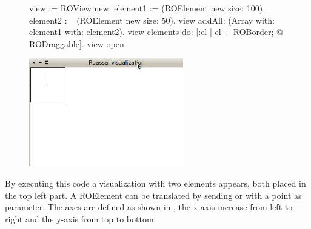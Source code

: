 \documentclass[a4paper,10pt,twoside]{book}
\begin{document}
\begin{figure}[H]
      \begin{minipage}[t]{0.5\textwidth}
      \vspace{0pt}
\begin{code}{}
view := ROView new.
element1 := (ROElement new size: 100).
element2 := (ROElement new size: 50).
view addAll: (Array with: element1 with: element2).
view elements do: [:el | el + ROBorder; @ RODraggable].
view open.
\end{code}
   \end{minipage}
   \hfill
   \begin{minipage}[t]{0.6\textwidth}
      \vspace{0pt} \raggedright
       \centering
		\includegraphics[width=0.6\textwidth]{ex3}
   \end{minipage}
\label{fig:ex3}
\end{figure}

By executing this code a visualization with two elements appears, both placed in the top left part. A ROElement can be translated by sending  or  with a point as parameter. The axes are defined as shown in , the x-axis increase from left to right and the y-axis from top to bottom.
\end{document}
